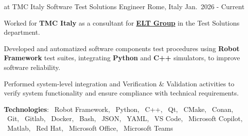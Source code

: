 

\begin{cventries}


    \cventry
    {at TMC Italy}
    {Software Test Solutions Engineer}
    {Rome, Italy}
    {Jan.\ 2026 - Current}
    {
        \begin{cvitems}
            \item Worked for \textbf{TMC Italy} as a consultant for \href{https://www.eltgroup.net}{\textbf{ELT Group}} in the Test Solutions department.
            \item Developed and automatized software components test procedures using \textbf{Robot Framework} test suites, integrating \textbf{Python} and \textbf{C++} simulators, to improve software reliability.
            \item Performed system-level integration and Verification \& Validation activities to verify system functionality and ensure compliance with technical requirements.
            \item[] \textbf{\textcolor{awesome}{Tec}hnologies}: \robotlogo{}~Robot Framework, \pythonlogo{}~Python, \cpplogo{}~C++, \qtlogo{}~Qt, \cmakelogo{}~CMake, \conanlogo{}~Conan, \gitlogo{}~Git, \gitlablogo{}~Gitlab, \dockerlogo{}~Docker, \bashlogo{}~Bash, \jsonlogo{}~JSON, \yamllogo{}~YAML, \vscodelogo{}~VS Code, \copilotlogo{}~Microsoft Copilot, \matlablogo{}~Matlab, \redhatlogo{}~Red Hat, \officelogo{}~Microsoft Office, \microsoftteamslogo{}~Microsoft Teams
        \end{cvitems}
    }



\end{cventries}
